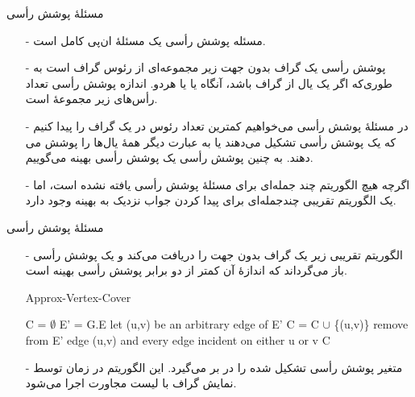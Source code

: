 
\begin{frame}{‌مسئلهٔ پوشش رأسی}
\begin{itemize}\itemr
\item[-]
مسئله پوشش رأسی
یک مسئلهٔ ان‌پی کامل است.
\item[-]
پوشش رأسی یک گراف بدون جهت
زیر مجموعه‌ای از رئوس گراف
است به طوری‌که اگر
یک یال از گراف
باشد، آنگاه
یا
یا هردو. اندازه پوشش رأسی تعداد رأس‌های زیر مجموعهٔ
است.
\item[-]
در مسئلهٔ پوشش رأسی می‌خواهیم کمترین تعداد رئوس در یک گراف را پیدا کنیم که یک پوشش رأسی تشکیل می‌دهند یا به عبارت دیگر همهٔ یال‌ها را پوشش می دهند. به چنین پوشش رأسی یک پوشش رأسی بهینه
می‌گوییم.
\item[-]
اگرچه هیچ الگوریتم چند جمله‌ای برای مسئلهٔ پوشش رأسی یافته نشده است، اما یک الگوریتم تقریبی چندجمله‌ای برای پیدا کردن جواب نزدیک به بهینه وجود دارد.
\end{itemize}
\end{frame}


\begin{frame}{‌مسئلهٔ پوشش رأسی}
\begin{itemize}\itemr
\item[-]
الگوریتم تقریبی زیر یک گراف بدون جهت را دریافت می‌کند و یک پوشش رأسی باز می‌گرداند که اندازهٔ آن کمتر از دو برابر پوشش رأسی بهینه است.
\begin{algorithm}[H]\alglr
  \caption{Approx-Vertex-Cover} 
  \begin{algorithmic}[1]
   \State C = $\emptyset$
   \State E' = G.E
   			\State let (u,v) be an arbitrary edge of E'
   			\State C = C $\cup$ \{(u,v)\}
   			\State remove from E' edge (u,v) and every edge incident on either u or v
   	\EndWhile
   	\State \Return C                      
  \end{algorithmic}
  \label{alg:merge}
\end{algorithm}
\item[-]
متغیر
پوشش رأسی تشکیل شده را در بر می‌گیرد. این الگوریتم در زمان
توسط نمایش گراف با لیست مجاورت اجرا می‌شود.
\end{itemize}
\end{frame}


